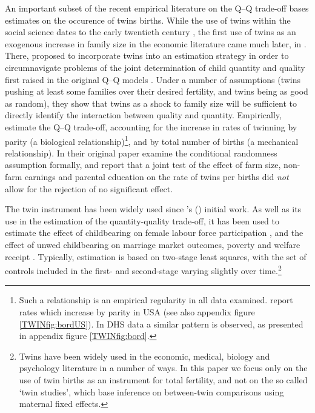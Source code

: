 \documentclass[subeqn]{article}
\begin{document}
\begin{spacing}{1.4}
An important subset of the recent empirical literature on the Q--Q trade-off
bases estimates on the occurence of twins births.  While the use of twins within
the social science dates to the early twentieth century \citep{Thorndike1905}, the
first use of twins as an exogenous increase in family size in the economic
literature came much later, in \citet{RosenzweigWolpin1980}. There,
\citet{RosenzweigWolpin1980} proposed to incorporate twins into an estimation
strategy in order to circumnavigate problems of the joint determination of child 
quantity and quality first raised in the original Q--Q models \citep{BeckerLewis1973,
  Willis1973,DeTray1973,BeckerTomes1976}.  Under a number of assumptions (twins
pushing at least some families over their desired fertility, and twins being as good
as random), they show that twins as a shock to family size will be sufficient to
directly identify the interaction between quality and quantity.  Empirically,
\citet{RosenzweigWolpin1980} estimate the Q--Q trade-off, accounting for the
increase in rates of twinning by parity (a biological relationship)\footnote{Such
  a relationship is an empirical regularity in all data examined.
  \citet{RosenzweigWolpin1980} report rates which increase by parity in USA (see
  also appendix figure \ref{TWINfig:bordUS}).  In DHS data a similar pattern is
  observed, as presented in appendix figure \ref{TWINfig:bord}.}, and by total
number of births (a mechanical relationship). In their original paper
\citeauthor{RosenzweigWolpin1980} examine the conditional randomness assumption
formally, and report that a joint test of the effect of farm size, non-farm
earnings and parental education on the rate of twins per births did \emph{not}
allow for the rejection of no significant effect.

The twin instrument has been widely used since \citeauthor{RosenzweigWolpin1980}'s
(\citeyear{RosenzweigWolpin1980}) initial work. As well as its use in the 
estimation of the quantity-quality trade-off, it has been used to estimate the
effect of childbearing on female labour force participation
\citep{RosenzweigWolpin1980b,Jacobsenetal1999,AngristEvans1998}, and the effect 
of unwed childbearing on marriage market outcomes, poverty and welfare receipt 
\citep{BronarsGrogger1994}.  Typically, estimation is based on two-stage least
squares, with the set of controls included in the first- and second-stage 
varying slightly over time.\footnote{Twins have been widely used in the economic, 
medical, biology and psychology literature in a number of ways.  In this paper 
we focus only on the use of twin births as an instrument for total fertility, 
and not on the so called `twin studies', which base inference on between-twin 
comparisons using maternal fixed effects.}


\end{spacing}
\end{document}
